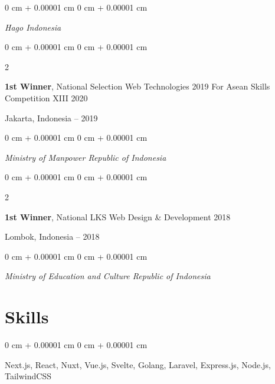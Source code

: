 \documentclass[10pt, letterpaper]{article}
\newenvironment{onecolentry}{
    \begin{adjustwidth}{
        0 cm + 0.00001 cm
    }{
        0 cm + 0.00001 cm
    }
}{
    \end{adjustwidth}
} %
\newenvironment{twocolentry}[2][]{
    \onecolentry
    \def\secondColumn{#2}
    \setcolumnwidth{\fill, 4.5 cm}
    \begin{paracol}{2}
}{
    \switchcolumn \raggedleft \secondColumn
    \end{paracol}
    \endonecolentry
} %
\begin{document}
\begin{samepage}
            \vspace{0.10 cm}
            
            \begin{onecolentry}
                \textit{Hago Indonesia}
                \vspace{0.10 cm}
            \end{onecolentry}

        
            \begin{twocolentry}{
                Jakarta, Indonesia -- 2019
            }
                \textbf{1st Winner}, 
                National Selection Web Technologies 2019 For Asean Skills Competition XIII 2020
            \end{twocolentry}

            \vspace{0.10 cm}
            
            \begin{onecolentry}
                \textit{Ministry of Manpower Republic of Indonesia}
                \vspace{0.10 cm}
            \end{onecolentry}

        
            \begin{twocolentry}{
                Lombok, Indonesia -- 2018
            }
                \textbf{1st Winner}, 
                National LKS Web Design \& Development 2018
            \end{twocolentry}

            \vspace{0.10 cm}
            
            \begin{onecolentry}
                \textit{Ministry of Education and Culture Republic of Indonesia}
                \vspace{0.10 cm}
            \end{onecolentry}


        
        \end{samepage}


    \section{Skills}
        \begin{onecolentry}
            Next.js, React, Nuxt, Vue.js, Svelte, Golang, Laravel, Express.js, Node.js, TailwindCSS
        \end{onecolentry}
\end{document}
